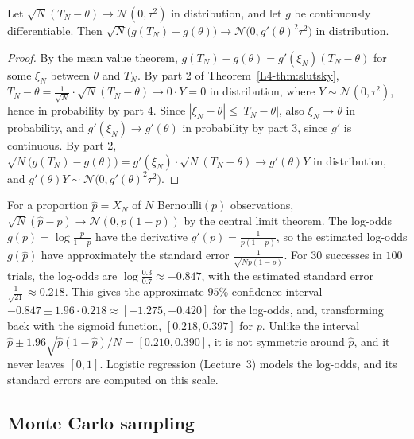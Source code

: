 \begin{proposition}\label{L4-prop:delta-method}
    Let $\sqrt{N}(T_N - \theta) \to \mathcal{N}(0, \tau^2)$ in distribution, and let $g$ be continuously differentiable. Then $\sqrt{N}\big(g(T_N) - g(\theta)\big) \to \mathcal{N}\big(0, g'(\theta)^2\tau^2\big)$ in distribution.
\end{proposition}

\begin{proof}
    By the mean value theorem, $g(T_N) - g(\theta) = g'(\xi_N)(T_N - \theta)$ for some $\xi_N$ between $\theta$ and $T_N$. By part 2 of Theorem~\ref{L4-thm:slutsky}, $T_N - \theta = \frac{1}{\sqrt{N}} \cdot \sqrt{N}(T_N - \theta) \to 0 \cdot Y = 0$ in distribution, where $Y \sim \mathcal{N}(0, \tau^2)$, hence in probability by part 4. Since $|\xi_N - \theta| \leq |T_N - \theta|$, also $\xi_N \to \theta$ in probability, and $g'(\xi_N) \to g'(\theta)$ in probability by part 3, since $g'$ is continuous. By part 2, $\sqrt{N}\big(g(T_N) - g(\theta)\big) = g'(\xi_N) \cdot \sqrt{N}(T_N - \theta) \to g'(\theta)Y$ in distribution, and $g'(\theta)Y \sim \mathcal{N}\big(0, g'(\theta)^2\tau^2\big)$.
\end{proof}

\begin{example}\label{L4-ex:delta}
    For a proportion $\hat p = \bar X_N$ of $N$ Bernoulli$(p)$ observations, $\sqrt{N}(\hat p - p) \to \mathcal{N}(0, p(1 - p))$ by the central limit theorem. The log-odds $g(p) = \log\frac{p}{1 - p}$ have the derivative $g'(p) = \frac{1}{p(1 - p)}$, so the estimated log-odds $g(\hat p)$ have approximately the standard error $\frac{1}{\sqrt{Np(1 - p)}}$. For $30$ successes in $100$ trials, the log-odds are $\log\frac{0.3}{0.7} \approx -0.847$, with the estimated standard error $\frac{1}{\sqrt{21}} \approx 0.218$. This gives the approximate $95\%$ confidence interval $-0.847 \pm 1.96 \cdot 0.218 \approx [-1.275, -0.420]$ for the log-odds, and, transforming back with the sigmoid function, $[0.218, 0.397]$ for $p$. Unlike the interval $\hat p \pm 1.96\sqrt{\hat p(1 - \hat p)/N} = [0.210, 0.390]$, it is not symmetric around $\hat p$, and it never leaves $[0, 1]$. Logistic regression (Lecture~3) models the log-odds, and its standard errors are computed on this scale.
\end{example}

\subsection{Monte Carlo sampling}\label{L4-sec:monte-carlo}

